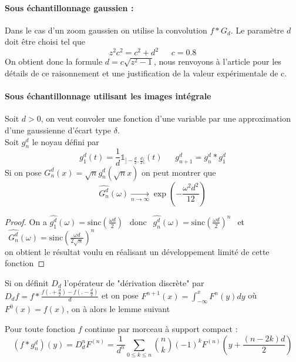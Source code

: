 \paragraph{Sous échantillonnage gaussien :}
Dans le cas d'un zoom gaussien on utilise la convolution $f*G_{d}$. Le paramètre $d$ doit être choisi tel que 
\begin{equation*}
z^2 c^2=c^2 + d^2     ~~~~~~~c= 0.8
\end{equation*}
On obtient donc la formule $d=c\sqrt{z^2 - 1}$, nous renvoyons à l'article \cite{morel2011sift} pour les détails de ce raisonnement et une justification de la valeur expérimentale de c.\\

\paragraph{Sous échantillonnage utilisant les images intégrale }
Soit $d>0$, on veut convoler une fonction d'une variable par une approximation d'une gaussienne d'écart type $\delta$.\\
Soit $g_n^d$ le noyau défini par 
\begin{equation*}
g_1^d(t)=\frac{1}{d}\mathds{1}_{]-\frac{d}{2},\frac{d}{2}[}(t) ~~~~~~~g_{n+1}^d= g_n^d * g_1^d
\end{equation*}
Si on pose $G_n^d(x)=\sqrt{n}g_n^d(\sqrt{n} x)$ on peut montrer que 
\begin{equation*}
\widehat{G_n^d}(\omega)\underset{n\rightarrow\infty}{\rightarrow} \exp\left(-\frac{\omega^2 d^2}{12}\right)
\end{equation*}
\begin{proof}
On a $\widehat{g_1^d}(\omega)=\text{sinc}\left(\frac{\omega d}{2}\right)~~$  donc $~~\widehat{g_n^d}(\omega)=\text{sinc}\left(\frac{\omega d}{2}\right)^n~~$ et 
$~~\widehat{G_n^d}(\omega)=\text{sinc}\left(\frac{\omega d}{2\sqrt{n}}\right)^n~~$\\
on obtient le résultat voulu en réalisant un développement limité de cette fonction 
\end{proof}
Si on définit $D_d$ l'opérateur de "dérivation discrète" par $D_d f=f*\frac{f(.+\frac{d}{2})-f(.-\frac{d}{2})}{d}$ et on pose $F^{n+1}(x)= \int_{-\infty}^{x}F^{n}(y)dy$ où $F^{0}(x)= f(x)$, on à alors le lemme suivant 
\begin{prop} Pour toute fonction $f$ continue par morceau à support compact :
\begin{equation*}
(f*g_n^d)(y)=D_d ^n F^{(n)}= \frac{1}{d^n}\underset{0 \le k\le n}{\sum} \binom{n}{k}(-1)^{k} F^{(n)}(y+\frac{(n-2k)d}{2})
\end{equation*}
\end{prop}
